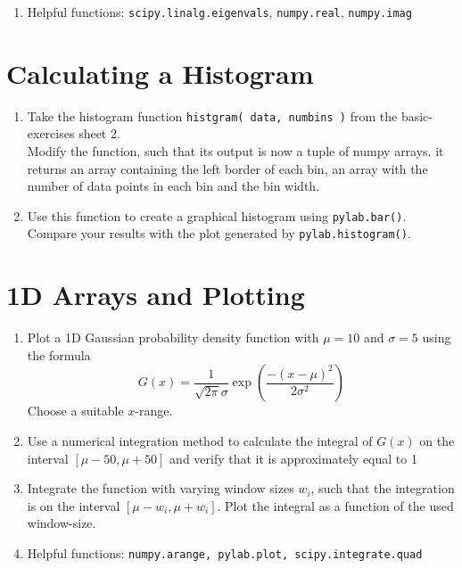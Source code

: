 \documentclass[smallheadings,12pt]{scrartcl}
\begin{document}
\begin{enumerate}
\begin{figure}[H]
\end{figure}

\item[] Helpful functions: {\tt scipy.linalg.eigenvals}, {\tt numpy.real}, {\tt numpy.imag}
\end{enumerate}

\section{Calculating a Histogram}

\begin{enumerate}
\item Take the histogram function {\tt histgram( data, numbins )} from the basic-exercises sheet 2. \\
Modify the function, such that its output is now a tuple of numpy arrays. it 
returns an array containing the left border of each bin, an array with the number of data points in each bin 
and the bin width. 
\item Use this function to create a graphical histogram using {\tt pylab.bar()}.
Compare your results with the plot generated by {\tt pylab.histogram()}.
\end{enumerate}



\section{1D Arrays and Plotting}
\begin{enumerate}
\item Plot a 1D Gaussian probability density function with $\mu=10$ and $\sigma=5$ using the formula
  \[
  G(x) = \frac{1}{\sqrt{2\pi}\sigma} \exp\left( \frac{-(x-\mu)^2}{2\sigma^2} \right)
  \]
  Choose a suitable $x$-range.

\item Use a numerical integration method to calculate the integral of
  $G(x)$ on the interval $[\mu-50,\mu+50]$ and verify that it is
  approximately equal to 1
\item Integrate the function with varying window sizes $w_i$, such that the
  integration is on the interval $[\mu-w_i, \mu+w_i]$. Plot the
  integral as a function of the used window-size.
\item[] Helpful functions: {\tt numpy.arange, pylab.plot, scipy.integrate.quad}
\end{enumerate}
\end{document}
